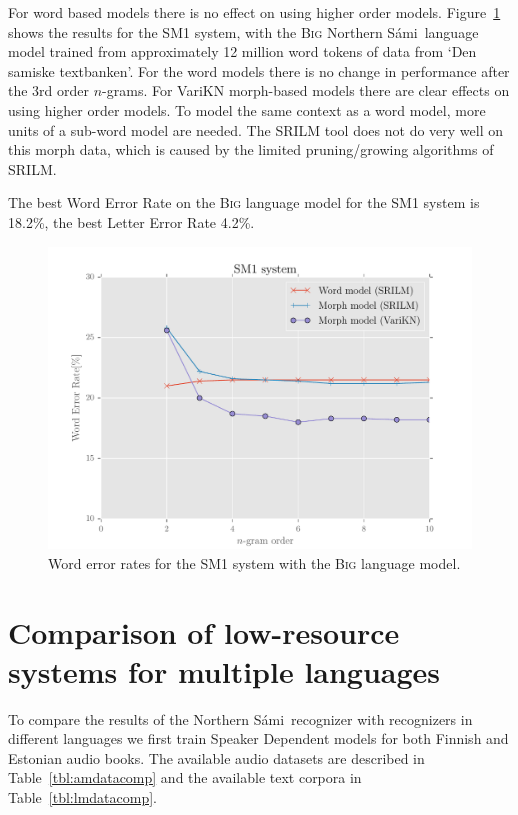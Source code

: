 \documentclass[b5paper]{article}
\newcommand{\ns}{Northern Sámi}
\newcommand{\ngram}{$n$-gram}
\newcommand{\ds}[1]{\textsc{#1}}
\begin{document}
For word based models there is no effect on using higher order models. Figure~\ref{fig:samiperf} shows the results for the SM1 system, with the \ds{Big} \ns\ language model trained from approximately 12 million word tokens of data from `Den samiske textbanken'. For the word models there is no change in performance after the 3rd order \ngram s. For VariKN morph-based models there are clear effects on using higher order models. To model the same context as a word model, more units of a sub-word model are needed. The SRILM tool does not do very well on this morph data, which is caused by the limited pruning/growing algorithms of SRILM.

The best Word Error Rate on the \ds{Big} language model for the SM1 system is 18.2\%, the best Letter Error Rate 4.2\%. 

\begin{figure}
\centering
\includegraphics[width=.9\textwidth]{figures/sme1}
\caption{Word error rates for the SM1 system with the \ds{Big} language model.}\label{fig:samiperf}

\end{figure}





\section{Comparison of low-resource systems for multiple languages}
\label{sec:compexp}
To compare the results of the \ns\ recognizer with recognizers in different languages we first train Speaker Dependent models for both Finnish and Estonian audio books. The available audio datasets are described in Table~\ref{tbl:amdatacomp} and the available text corpora in Table~\ref{tbl:lmdatacomp}. 
\end{document}
